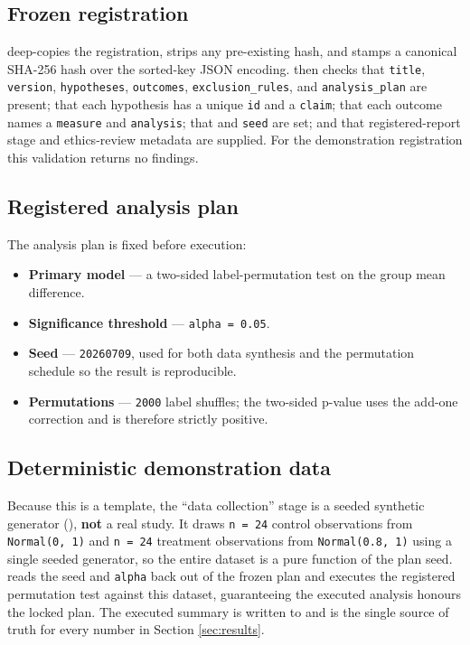 \documentclass[
]{article}
\providecommand{\tightlist}{%
  \setlength{\itemsep}{0pt}\setlength{\parskip}{0pt}}
\begin{document}
\subsection{Frozen registration}\label{frozen-registration}

 deep-copies the registration, strips any
pre-existing hash, and stamps a canonical SHA-256 hash over the
sorted-key JSON encoding.  then checks
that \texttt{title}, \texttt{version}, \texttt{hypotheses},
\texttt{outcomes}, \texttt{exclusion\_rules}, and
\texttt{analysis\_plan} are present; that each hypothesis has a unique
\texttt{id} and a \texttt{claim}; that each outcome names a
\texttt{measure} and \texttt{analysis}; that
 and \texttt{seed} are set; and
that registered-report stage and ethics-review metadata are supplied.
For the demonstration registration this validation returns no findings.

\subsection{Registered analysis plan}\label{registered-analysis-plan}

The analysis plan is fixed before execution:

\begin{itemize}
\tightlist
\item
  \textbf{Primary model} --- a two-sided label-permutation test on the
  group mean difference.
\item
  \textbf{Significance threshold} --- \texttt{alpha\ =\ 0.05}.
\item
  \textbf{Seed} --- \texttt{20260709}, used for both data synthesis and
  the permutation schedule so the result is reproducible.
\item
  \textbf{Permutations} --- \texttt{2000} label shuffles; the two-sided
  p-value uses the add-one correction
   and is therefore strictly
  positive.
\end{itemize}

\subsection{Deterministic demonstration
data}\label{deterministic-demonstration-data}

Because this is a template, the ``data collection'' stage is a seeded
synthetic generator (), \textbf{not} a
real study. It draws \texttt{n\ =\ 24} control observations from
\texttt{Normal(0,\ 1)} and \texttt{n\ =\ 24} treatment observations from
\texttt{Normal(0.8,\ 1)} using a single seeded generator, so the entire
dataset is a pure function of the plan seed.
 reads the seed and \texttt{alpha}
back out of the frozen plan and executes the registered permutation test
against this dataset, guaranteeing the executed analysis honours the
locked plan. The executed summary is written to
 and is the single source of
truth for every number in Section \ref{sec:results}.
\end{document}
